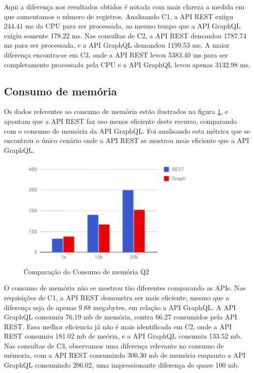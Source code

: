 Aqui a diferença nos resultados obtidos é notada com mais clareza a medida em que aumentamos o número de registros. Analizando C1, a API REST exiigu 244.41 ms da CPU para ser processada, ao mesmo tempo que a API GraphQL exigiu somente 178.22 ms. Nas consultas de C2, a API REST demandou 1787.74 ms para ser processada, e a API GraphQL demandou 1199.53 ms. A maior diferença encontra-se em C3, onde a API REST levou 5383.40 ms para ser completamente processada pela CPU e a API GraphQL levou apenas 3132.98 ms.

\subsection{Consumo de memória}

Os dados referentes ao consumo de memória estão ilustrados na figura \ref{fig:q2-mem}, e apontam que a API REST faz uso menos eficiente deste recurso, comparando com o consumo de memória da API GraphQL. Foi analisando esta métrica que se encontrou o único cenário onde a API REST se mostrou mais eficiente que a API GraphQL.

\begin{figure}[htbp]
    \centering
    \includegraphics[width=0.8\textwidth]{figuras/q2-mem.png}
    \caption{Comparação do Consumo de memória Q2}
    \label{fig:q2-mem}
    \author{fonte: Autor}
\end{figure}

O consumo de memória não se mostrou tão diferentes comparando as APIs. Nas requisições de C1, a API REST demonstra ser mais eficiente, mesmo que a diferença seja de apenas 9.88 megabytes, em relação a API GraphQL. A API GraphQL consumiu 76.19 mb de memória, contra 66.27 consumidos pela API REST. Essa melhor eficiencia já não é mais identificada em C2, onde a API REST consumiu 181.02 mb de meória, e a API GraphQL consumiu 133.52 mb. Nas consultas de C3, observamos uma diferença relevante no consumo de mémoria, com a API REST consumindo 300.30 mb de memória enquanto a API GraphQL consumindo 206.02, uma impressionante diferença de quase 100 mb.

